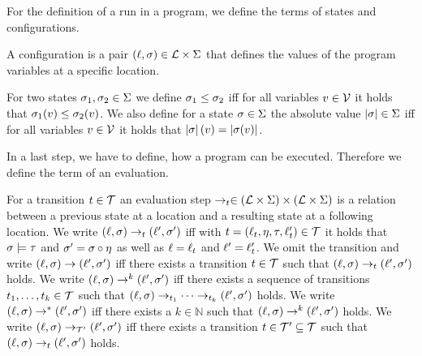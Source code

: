 For the definition of a run in a program, we define the terms of states and configurations.

\begin{definition}[Configuration] 
  A configuration is a pair $(\ell, \sigma) \in \mathcal{L} \times \Sigma$ that defines the values of the program variables at a specific location.
\end{definition}

For two states $\sigma_1, \sigma_2 \in \Sigma$ we define $\sigma_1 \leq \sigma_2$ iff for all variables $v \in \mathcal{V}$ it holds that $\sigma_1(v) \leq \sigma_2(v)$.
We also define for a state $\sigma \in \Sigma$ the absolute value $\left|\sigma\right| \in \Sigma$ iff for all variables $v \in \mathcal{V}$ it holds that $\left|\sigma\right|(v) = \left|\sigma(v)\right|$.

In a last step, we have to define, how a program can be executed.
Therefore we define the term of an evaluation.

\begin{definition}[Evaluation] 
  For a transition $t \in \mathcal{T}$ an evaluation step $\rightarrow_t \in (\mathcal{L} \times \Sigma) \times (\mathcal{L} \times \Sigma)$ is a relation between a previous state at a location and a resulting state at a following location.
  We write $(\ell, \sigma) \rightarrow_t (\ell', \sigma')$ iff with $t = (\ell_t, \eta, \tau, \ell_t') \in \mathcal{T}$ it holds that $\sigma \models \tau$ and $\sigma' = \sigma \circ \eta$ as well as $\ell = \ell_t$ and $\ell' = \ell_t'$.
  We omit the transition and write $(\ell, \sigma) \rightarrow (\ell', \sigma')$ iff there exists a transition $t \in \mathcal{T}$ such that $(\ell, \sigma) \rightarrow_t (\ell', \sigma')$ holds.
  We write $(\ell, \sigma) \rightarrow^k (\ell', \sigma')$ iff there exists a sequence of transitions $t_1, \dots, t_k \in \mathcal{T}$ such that $(\ell, \sigma) \rightarrow_{t_1} \dots \rightarrow_{t_k} (\ell', \sigma')$ holds.
  We write $(\ell, \sigma) \rightarrow^* (\ell', \sigma')$ iff there exists a $k \in \mathbb{N}$ such that $(\ell, \sigma) \rightarrow^k (\ell', \sigma')$ holds.
  We write $(\ell, \sigma) \rightarrow_{\mathcal{T}'} (\ell', \sigma')$ iff there exists a transition $t \in \mathcal{T}' \subseteq \mathcal{T}$ such that $(\ell, \sigma) \rightarrow_t (\ell', \sigma')$ holds.
\end{definition}
